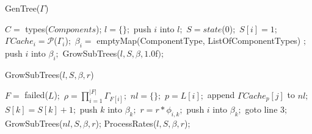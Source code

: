 \documentclass[a4paper,12pt]{article}
\author{Mihir Sanghavi}
\date{November 2012}
\begin{document}
\begin{algorithm}
\caption{GenTree($\Gamma$)}
\label{alg:gentree}
\begin{algorithmic}[1]
\STATE $C = $ types($Components$);
   	\STATE $l = \{\};$ 
   	\STATE push $i$ into $l;$
   	\STATE $S = state$(0)$;$
    \STATE $S[i] =1;$
    \STATE $\Gamma Cache_i = \mathcal{P}$($\Gamma_i$)$;$
    \STATE $\beta _i =$ emptyMap(ComponentType, ListOfComponentTypes) $;$
    \STATE push $i$ into $\beta _i;$
    \STATE GrowSubTrees($l,S,\beta,1.0$f$);$
   \ENDIF
\ENDFOR
\end{algorithmic}
\end{algorithm}

\begin{algorithm}
\caption{GrowSubTrees($l,S,\beta,r$)}
\label{alg:growsubtrees}
\begin{algorithmic}[1]
\STATE $F = $ failed($L$)$;$
\STATE $\rho = \prod\limits_{i=1}^{|F|}\Gamma_{F[i]};$ 
  \STATE $nl = \{\};$ 
    \STATE $p = L[i];$  
    \STATE append $\Gamma Cache_p[j]$ to $nl;$
        \STATE $S[k] = S[k] + 1;$
        \STATE push $k$ into $\beta _k;$ 
        \STATE $r = r * \phi_{i,k};$ 
      \ELSE
        \STATE push $i$ into $\beta _k;$ 
      \ENDIF
    \ENDFOR
  \ENDFOR
      \STATE goto line 3$;$ 
    \ENDIF
  \ENDFOR
  \STATE GrowSubTrees($nl,S,\beta,r$); 
  \ELSE
  \STATE ProcessRates($l,S,\beta,r$); 
  \ENDIF
\ENDFOR
\end{algorithmic}
\end{algorithm}
\end{document}
